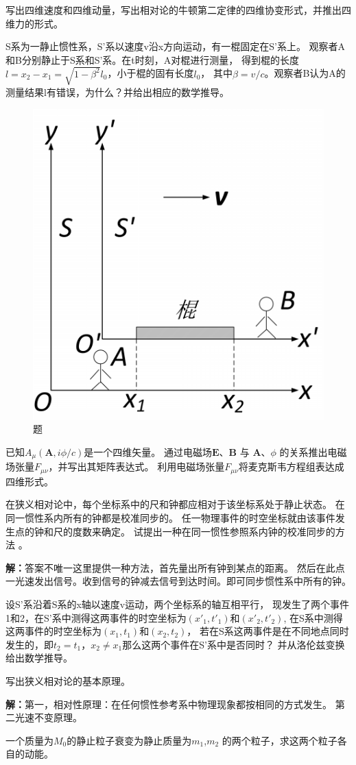 \begin{question}
    写出四维速度和四维动量，写出相对论的牛顿第二定律的四维协变形式，并推出四维力的形式。
\end{question}

\begin{question}
    S系为一静止惯性系，S'系以速度v沿x方向运动，有一棍固定在S'系上。
    观察者A和B分别静止于S系和S'系。在t时刻，A对棍进行测量，
    得到棍的长度$l=x_2-x_1=\sqrt{1-\beta^2}l_0$，小于棍的固有长度$l_0$，
    其中$\beta=v/c$。观察者B认为A的测量结果l有错误，为什么？并给出相应的数学推导。
    \begin{figure}[ht]
        \centering
        \includegraphics[height=3 cm]{images/q6_1.png}
        \caption{题\thequestion}
    \end{figure}
\end{question}

\begin{question}
    已知$A_\mu(\mathbf{A},i\phi /c)$是一个四维矢量。
    通过电磁场$\mathbf{E}$、$\mathbf{B}$ 与 $\mathbf{A}$、$\phi$ 
    的关系推出电磁场张量$F_{\mu \nu}$，并写出其矩阵表达式。
    利用电磁场张量$F_{\mu \nu}$将麦克斯韦方程组表达成四维形式。
\end{question}

\begin{question}
    在狭义相对论中，每个坐标系中的尺和钟都应相对于该坐标系处于静止状态。
    在同一惯性系内所有的钟都是校准同步的。
    任一物理事件的时空坐标就由该事件发生点的钟和尺的度数来确定。
    试提出一种在同一惯性参照系内钟的校准同步的方法 。
\end{question}

\noindent\textbf{解：}答案不唯一这里提供一种方法，首先量出所有钟到某点的距离。
然后在此点一光速发出信号。收到信号的钟减去信号到达时间。即可同步惯性系中所有的钟。

\begin{question}
    设S'系沿着S系的x轴以速度v运动，两个坐标系的轴互相平行，
    现发生了两个事件1和2，在S'系中测得这两事件的时空坐标为$(x'_1,t'_1)$和$(x'_2,t'_2)$,
    在S系中测得这两事件的时空坐标为$(x_1,t_1)$和$(x_2,t_2)$，
    若在S系这两事件是在不同地点同时发生的，即$t_2=t_1$，$x_2 \neq x_1$那么这两个事件在S'系中是否同时？
    并从洛伦兹变换给出数学推导。
\end{question}

\begin{question}
    写出狭义相对论的基本原理。
\end{question}

\noindent\textbf{解：}第一，相对性原理：在任何惯性参考系中物理现象都按相同的方式发生。
第二光速不变原理。


\begin{question}
    一个质量为$M_0$的静止粒子衰变为静止质量为$m_1$,$m_2$ 的两个粒子，求这两个粒子各自的动能。
\end{question}
